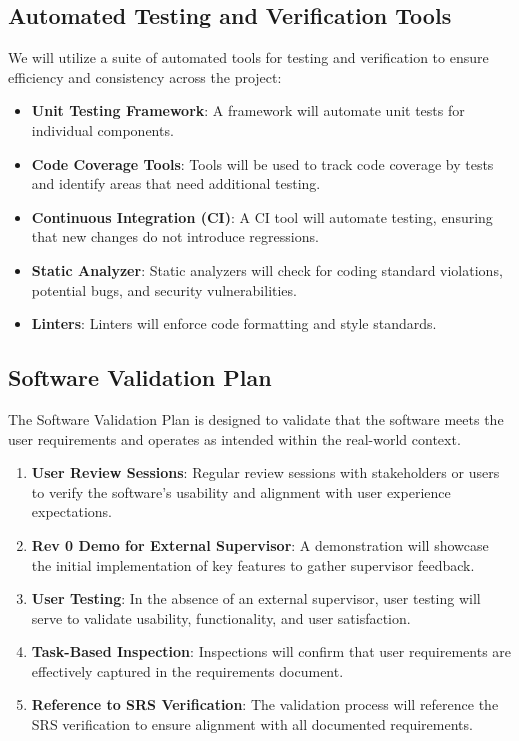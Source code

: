 \documentclass[12pt, titlepage]{article}
\begin{document}
\subsection{Automated Testing and Verification Tools}
We will utilize a suite of automated tools for testing and verification to ensure efficiency and consistency across the project:

\begin{itemize}
    \item \textbf{Unit Testing Framework}: A framework will automate unit tests for individual components.
    \item \textbf{Code Coverage Tools}: Tools will be used to track code coverage by tests and identify areas that need additional testing.
    \item \textbf{Continuous Integration (CI)}: A CI tool will automate testing, ensuring that new changes do not introduce regressions.
    \item \textbf{Static Analyzer}: Static analyzers will check for coding standard violations, potential bugs, and security vulnerabilities.
    \item \textbf{Linters}: Linters will enforce code formatting and style standards.
\end{itemize}

\subsection{Software Validation Plan}
The Software Validation Plan is designed to validate that the software meets the user requirements and operates as intended within the real-world context.

\begin{enumerate}
    \item \textbf{User Review Sessions}: Regular review sessions with stakeholders or users to verify the software’s usability and alignment with user experience expectations.
    \item \textbf{Rev 0 Demo for External Supervisor}: A demonstration will showcase the initial implementation of key features to gather supervisor feedback.
    \item \textbf{User Testing}: In the absence of an external supervisor, user testing will serve to validate usability, functionality, and user satisfaction.
    \item \textbf{Task-Based Inspection}: Inspections will confirm that user requirements are effectively captured in the requirements document.
    \item \textbf{Reference to SRS Verification}: The validation process will reference the SRS verification to ensure alignment with all documented requirements.
\end{enumerate}
\end{document}
